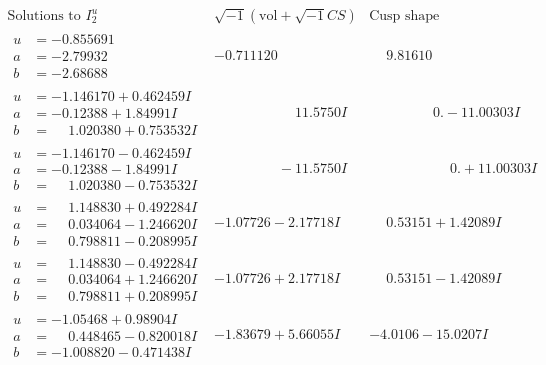 \documentclass[1p]{elsarticle_modified}
\theoremstyle{definition}
\newcommand{\I}{\sqrt{-1}}
\begin{document}
$$\begin{array}{c|c|c}  
\text{Solutions to }I^u_{2}& \I (\text{vol} + \sqrt{-1}CS) & \text{Cusp shape}\\
 \hline 
\begin{aligned}
u &= -0.855691\phantom{ +0.000000I} \\
a &= -2.79932\phantom{ +0.000000I} \\
b &= -2.68688\phantom{ +0.000000I}\end{aligned}
 & -0.711120\phantom{ +0.000000I} & \phantom{-}9.81610\phantom{ +0.000000I} \\ \hline\begin{aligned}
u &= -1.146170 + 0.462459 I \\
a &= -0.12388 + 1.84991 I \\
b &= \phantom{-}1.020380 + 0.753532 I\end{aligned}
 & \phantom{-0.000000 -}11.5750 I & \phantom{-0.000000 } 0. - 11.00303 I \\ \hline\begin{aligned}
u &= -1.146170 - 0.462459 I \\
a &= -0.12388 - 1.84991 I \\
b &= \phantom{-}1.020380 - 0.753532 I\end{aligned}
 & \phantom{-0.000000 } -11.5750 I & \phantom{-0.000000 -}0. + 11.00303 I \\ \hline\begin{aligned}
u &= \phantom{-}1.148830 + 0.492284 I \\
a &= \phantom{-}0.034064 - 1.246620 I \\
b &= \phantom{-}0.798811 - 0.208995 I\end{aligned}
 & -1.07726 - 2.17718 I & \phantom{-}0.53151 + 1.42089 I \\ \hline\begin{aligned}
u &= \phantom{-}1.148830 - 0.492284 I \\
a &= \phantom{-}0.034064 + 1.246620 I \\
b &= \phantom{-}0.798811 + 0.208995 I\end{aligned}
 & -1.07726 + 2.17718 I & \phantom{-}0.53151 - 1.42089 I \\ \hline\begin{aligned}
u &= -1.05468 + 0.98904 I \\
a &= \phantom{-}0.448465 - 0.820018 I \\
b &= -1.008820 - 0.471438 I\end{aligned}
 & -1.83679 + 5.66055 I & -4.0106 - 15.0207 I \\ \hline\begin{aligned}

\end{aligned}
\end{array}$$
\end{document}

